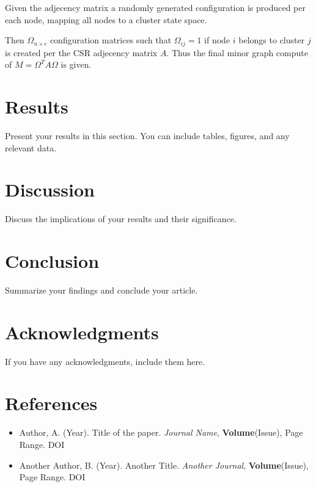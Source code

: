\documentclass[a4paper, 12pt]{article}
\begin{document}
Given the adjecency matrix a randomly generated configuration is produced per each node, mapping all nodes to a cluster state space.

Then  $ \Omega_{n \times c}$ configuration matrices such that $\Omega_{ij} = 1$ if node $i$ belongs to cluster $j$ is created per the CSR adjecency matrix  $A$. Thus the final minor graph compute of $M = \Omega^T A \Omega$ is given.

\section{Results}
Present your results in this section. You can include tables, figures, and any relevant data.

\section{Discussion}
Discuss the implications of your results and their significance.

\section{Conclusion}
Summarize your findings and conclude your article.

\section*{Acknowledgments}
If you have any acknowledgments, include them here.

\section*{References}
\begin{itemize}
    \item Author, A. (Year). Title of the paper. \textit{Journal Name}, \textbf{Volume}(Issue), Page Range. DOI
    \item Another Author, B. (Year). Another Title. \textit{Another Journal}, \textbf{Volume}(Issue), Page Range. DOI
\end{itemize}
\end{document}
